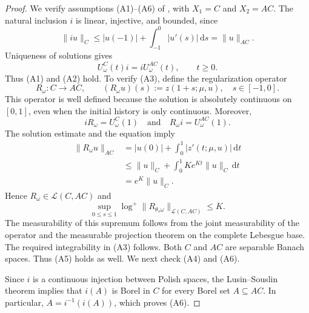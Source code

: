 \documentclass[reqno]{amsart}
\theoremstyle{plain}
\numberwithin{equation}{section}
\numberwithin{definition}{section}
\newcommand{\dd}{\ensuremath{\mathrm{d}}}
\begin{document}
\begin{proof}
We verify assumptions (A1)--(A6) of
\cite[Section~3]{Kryspin2024}, with
$X_1=C$ and $X_2=AC$. The natural inclusion $i$ is linear, injective, and bounded,
since
\begin{equation*}
    \|iu\|_C
    \leq
    |u(-1)|+\int_{-1}^{0}|u'(s)|\,\dd s
    =
    \|u\|_{AC}.
\end{equation*}
Uniqueness of solutions gives
\begin{equation*}
    U_\omega^C(t)i=iU_\omega^{AC}(t),
    \qquad t\geq0.
\end{equation*}
Thus (A1) and (A2) hold. To verify (A3), define the regularization operator
\begin{equation*}
    R_\omega:C\to AC,
    \qquad
    (R_\omega u)(s):=z(1+s;\mu,u),
    \quad s\in[-1,0].
\end{equation*}
This operator is well defined because the solution
is absolutely continuous on $[0,1]$, even when the
initial history is only continuous.
Moreover,
\begin{equation*}
    iR_\omega=U_\omega^C(1)
    \quad \text{and} \quad
    R_\omega i=U_\omega^{AC}(1).
\end{equation*}
The solution estimate and the equation imply
\begin{equation*}
    \begin{aligned}
        \|R_\omega u\|_{AC}
        &=
        |u(0)|+\int_0^1|z'(t;\mu,u)|\,\dd t\\
        &\leq
        \|u\|_C+
        \int_0^1 K e^{Kt}\|u\|_C\,\dd t\\
        &=e^K\|u\|_C.
    \end{aligned}
\end{equation*}
Hence $R_\omega\in\mathcal L(C,AC)$ and
\begin{equation*}
    \sup_{0\leq s\leq1}
    \log^+\|R_{\theta_s\omega}\|_{\mathcal L(C,AC)}
    \leq K.
\end{equation*}
The measurability of this supremum follows from the
joint measurability of the operator and the
measurable projection theorem on the complete Lebesgue
base. The required integrability in (A3) follows. Both $C$ and $AC$ are separable Banach spaces. Thus (A5) holds as well. We next check (A4) and (A6).

Since $i$ is a continuous injection between Polish spaces,
the Lusin--Souslin theorem implies that $i(A)$ is Borel
in $C$ for every Borel set $A\subseteq AC$.
In particular, $A=i^{-1}(i(A))$, 
which proves (A6).


\end{proof}
\end{document}
